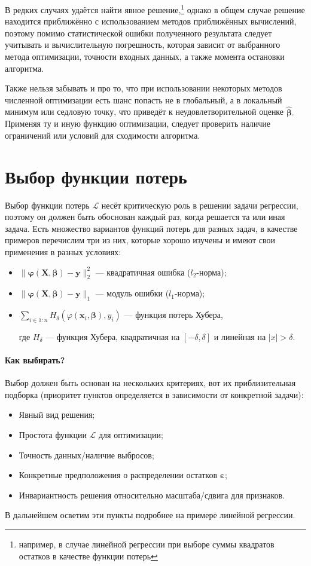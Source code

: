 \documentclass[12pt,a4paper,final]{article}
\newcommand{\betah}{\hat{\bm \beta}}
\newcommand{\betaa}{\bm{\beta}}
\newcommand{\1}{\mathds{1}}
\begin{document}
В редких случаях удаётся найти явное решение,\footnote{например, в случае линейной регрессии при выборе суммы квадратов остатков в качестве функции потерь} однако в общем случае решение находится приближённо с использованием методов приближённых вычислений, поэтому помимо статистической ошибки полученного результата следует учитывать и вычислительную погрешность, которая зависит от выбранного метода оптимизации, точности входных данных, а также момента остановки алгоритма.

Также нельзя забывать и про то, что при использовании некоторых методов численной оптимизации есть шанс попасть не в глобальный, а в локальный минимум или седловую точку, что приведёт к неудовлетворительной оценке $\betah.$ Применяя ту и иную функцию оптимизации, следует проверить наличие ограничений или условий для сходимости алгоритма.

\section{Выбор функции потерь}

Выбор функции потерь $\mathcal L$ несёт критическую роль в решении задачи регрессии, поэтому он должен быть обоснован каждый раз, когда решается та или иная задача.
Есть множество вариантов функций потерь для разных задач, в качестве примеров перечислим три из них, которые хорошо изучены и имеют свои применения в разных условиях:
\begin{itemize}
	\item $\|\bm \varphi(\bm X, \betaa) - \bm y\|^2_2$ --- квадратичная ошибка ($l_2$-норма);
	\item $\|\bm \varphi(\bm X, \betaa) - \bm y\|_1$ --- модуль ошибки ($l_1$-норма);
	\item $\sum_{i \in 1:n} H_\delta(\varphi(\mathbf x_i, \betaa), y_i)$ --- функция потерь Хубера, 
	
	где $H_\delta$ --- функция Хубера, квадратичная на $[-\delta, \delta]$ и линейная на $|x|>\delta$.
\end{itemize}


\paragraph{Как выбирать?}

Выбор должен быть основан на нескольких критериях, вот их приблизительная подборка (приоритет пунктов определяется в зависимости от конкретной задачи):

\begin{itemize}
	\item Явный вид решения;
	\item Простота функции $\mathcal L$ для оптимизации;
	\item Точность данных/наличие выбросов;
	\item Конкретные предположения о распределении остатков $\bm \varepsilon$;
	\item Инвариантность решения относительно масштаба/сдвига для признаков.
\end{itemize}
В дальнейшем осветим эти пункты подробнее на примере линейной регрессии.
\end{document}
